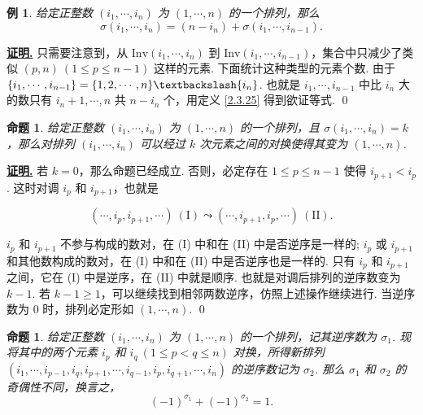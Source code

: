 \documentclass[10pt,openany]{article}
\theoremstyle{thmstyle} %
\theoremstyle{defstyle} %
\theoremstyle{prostyle} %
\newtheorem{proposition}[theorem]{命题}
\theoremstyle{exastyle}
\newtheorem{example}[theorem]{例}
\theoremstyle{remstyle}
\renewenvironment{proof}[1][证明]{\par\underline{\textbf{#1.}} \;\fangsong}{\qed\par}
\begin{document}
\begin{example} \label{2.3.26}
	给定正整数 \( (i_1,\cdots,i_n) \) 为 \( (1,\cdots,n) \) 的一个排列，那么 
	\[ \sigma(i_1,\cdots,i_n)=(n-i_n)+\sigma(i_1,\cdots,i_{n-1}). \]
\end{example}

\begin{proof}
	只需要注意到，从 \( \text{Inv}(i_1,\cdots,i_n) \) 到 \( \text{Inv}(i_1,\cdots,i_{n-1}) \)，集合中只减少了类似 \( (p,n) \ (1 \leq p \leq n-1) \) 这样的元素. 下面统计这种类型的元素个数. 由于 \( \{ i_1,\cdots,i_{n-1} \}= \{1,2,\cdots,n\} \textbackslash \{i_n\} \). 也就是 \( i_1,\cdots,i_{n-1} \) 中比 \( i_n \) 大的数只有 \( i_n+1,\cdots,n \) 共 \( n-i_n \) 个，用定义 \ref{2.3.25} 得到欲证等式.
\end{proof}

\begin{proposition} \label{2.3.27}
	给定正整数 \( (i_1,\cdots,i_n) \) 为 \( (1,\cdots,n) \) 的一个排列，且 \( \sigma(i_1,\cdots,i_n)=k \)，那么对排列 \( (i_1,\cdots,i_n) \) 可以经过 \( k \) 次元素之间的对换使得其变为 \( (1,\cdots,n) \). 
\end{proposition}

\begin{proof}
	若 \( k=0 \)，那么命题已经成立. 否则，必定存在 \( 1 \leq p \leq n-1 \) 使得 \( i_{p+1}<i_{p} \). 这时对调 \( i_p \) 和 \( i_{p+1} \)，也就是
	
	\[ (\cdots,i_p,i_{p+1},\cdots) \ (\text{I}) \leadsto (\cdots,i_{p+1},i_{p},\cdots) \ (\text{II}). \]
	
	\( i_p \) 和 \( i_{p+1} \) 不参与构成的数对，在 (I) 中和在 (II) 中是否逆序是一样的; \( i_p \) 或 \( i_{p+1} \) 和其他数构成的数对，在 (I) 中和在 (II) 中是否逆序也是一样的. 只有 \( i_p \) 和 \( i_{p+1} \) 之间，它在 (I) 中是逆序，在 (II) 中就是顺序. 也就是对调后排列的逆序数变为 \( k-1 \). 若 \( k-1 \geq 1 \)，可以继续找到相邻两数逆序，仿照上述操作继续进行. 当逆序数为 0 时，排列必定形如  \( (1,\cdots,n) \).
\end{proof}
 
\begin{proposition} \label{2.3.28}
	给定正整数 \( (i_1,\cdots,i_n) \) 为 \( (1,\cdots,n) \) 的一个排列，记其逆序数为 \( \sigma_1 \). 现将其中的两个元素 \( i_p \) 和 \( i_q \ (1 \leq p<q \leq n) \) 对换，所得新排列 \( (i_1,\cdots,i_{p-1},i_q,i_{p+1},\cdots,i_{q-1},i_p,i_{q+1},\cdots,i_n) \) 的逆序数记为 \( \sigma_2 \). 那么 \( \sigma_1 \) 和 \( \sigma_2 \) 的奇偶性不同，换言之，
	\[ (-1)^{\sigma_1}+(-1)^{\sigma_2}=1. \]
\end{proposition}
\end{document}
